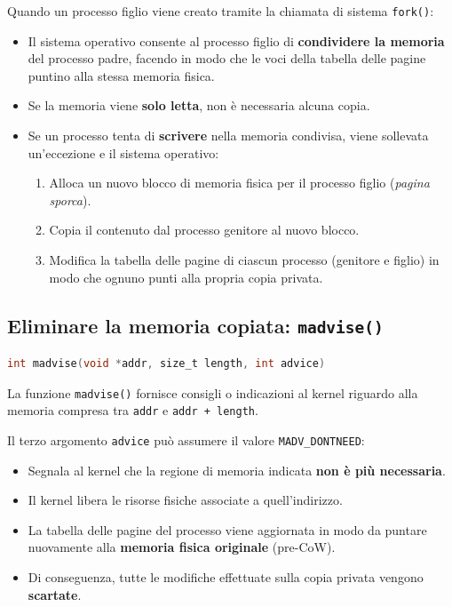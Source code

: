 \documentclass{article}
\begin{document}
Quando un processo figlio viene creato tramite la chiamata di sistema \texttt{fork()}:
\begin{itemize}
    \item Il sistema operativo consente al processo figlio di \textbf{condividere la memoria} del processo padre, facendo in modo che le voci della tabella delle pagine puntino alla stessa memoria fisica.
    \item Se la memoria viene \textbf{solo letta}, non è necessaria alcuna copia.
    \item Se un processo tenta di \textbf{scrivere} nella memoria condivisa, viene sollevata un'eccezione e il sistema operativo:
    \begin{enumerate}
        \item Alloca un nuovo blocco di memoria fisica per il processo figlio (\textit{pagina sporca}).
        \item Copia il contenuto dal processo genitore al nuovo blocco.
        \item Modifica la tabella delle pagine di ciascun processo (genitore e figlio) in modo che ognuno punti alla propria copia privata.
    \end{enumerate}
\end{itemize}

\subsection*{Eliminare la memoria copiata: \texttt{madvise()}}

\begin{lstlisting}[language=C]
int madvise(void *addr, size_t length, int advice)
\end{lstlisting}

La funzione \texttt{madvise()} fornisce consigli o indicazioni al kernel riguardo alla memoria compresa tra \texttt{addr} e \texttt{addr + length}.

Il terzo argomento \texttt{advice} può assumere il valore \texttt{MADV\_DONTNEED}:
\begin{itemize}
    \item Segnala al kernel che la regione di memoria indicata \textbf{non è più necessaria}.
    \item Il kernel libera le risorse fisiche associate a quell'indirizzo.
    \item La tabella delle pagine del processo viene aggiornata in modo da puntare nuovamente alla \textbf{memoria fisica originale} (pre-CoW).
    \item Di conseguenza, tutte le modifiche effettuate sulla copia privata vengono \textbf{scartate}.
\end{itemize}
\end{document}

